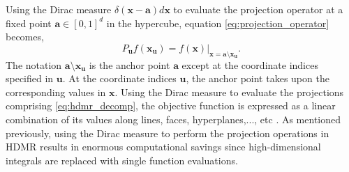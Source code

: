 Using the Dirac measure $\delta(\textbf{x}-\textbf{a})d\textbf{x}$ to evaluate the projection operator at a fixed point $\textbf{a} \in \left[0,1\right]^d$ in the hypercube, equation \ref{eq:projection_operator} becomes,
\begin{equation} \label{eq:projection_operator_dirac}
    P_\textbf{u}f\left(\textbf{x}_\textbf{u}\right) = 
     f\left(\textbf{x}\right)\vert_{\textbf{x}=
      \textbf{a}\setminus\textbf{x}_\textbf{u}}.
\end{equation}
The notation $\textbf{a}\setminus\textbf{x}_\textbf{u}$ is the anchor point $\textbf{a}$ except at the coordinate indices specified in $\textbf{u}$. At the coordinate indices $\textbf{u}$, the anchor point takes upon the corresponding values in $\textbf{x}$. Using the Dirac measure to evaluate the projections comprising \ref{eq:hdmr_decomp}, the objective function is expressed as a linear combination of its values along lines, faces, hyperplanes,..., etc \cite{Holtz}. As mentioned previously, using the Dirac measure to perform the projection operations in \ac{HDMR} results in enormous computational savings since high-dimensional integrals are replaced with single function evaluations.

